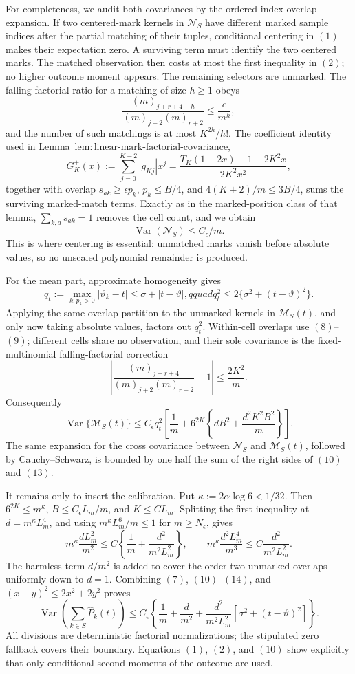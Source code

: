 For completeness, we audit both covariances by the ordered-index overlap expansion.  If two centered-mark kernels in \(\mathcal N_S\) have different marked sample indices after the partial matching of their tuples, conditional centering in \((1)\) makes their expectation zero.  A surviving term must identify the two centered marks.  The matched observation then costs at most the first inequality in \((2)\); no higher outcome moment appears.  The remaining selectors are unmarked.  The falling-factorial ratio for a matching of size \(h\ge1\) obeys
\[
 \frac{(m)_{j+r+4-h}}{(m)_{j+2}(m)_{r+2}}
 \le \frac e{m^h},
\tag{8}
\]
and the number of such matchings is at most \(K^{2h}/h!\).  The coefficient identity used in Lemma~\(\mathrm{lem:linear\text{-}mark\text{-}factorial\text{-}covariance}\),
\[
 G_K^+(x):=\sum_{j=0}^{K-2}|g_{Kj}|x^j
 =\frac{T_K(1+2x)-1-2K^2x}{2K^2x^2},
\tag{9}
\]
together with overlap \(s_{ak}\ge\epsilon p_k\), \(p_k\le B/4\), and \(4(K+2)/m\le3B/4\), sums the surviving marked-match terms.  Exactly as in the marked-position class of that lemma, \(\sum_{k,a}s_{ak}=1\) removes the cell count, and we obtain
\[
 \operatorname{Var}(\mathcal N_S)\le C_{\epsilon}/m.
\tag{10}
\]
This is where centering is essential: unmatched marks vanish before absolute values, so no unscaled polynomial remainder is produced.

For the mean part, approximate homogeneity gives
\[
 q_t:=\max_{k:p_k>0}|\vartheta_k-t|
 \le\sigma+|t-\vartheta|,qquad
 q_t^2\le2\{\sigma^2+(t-\vartheta)^2\}.
\tag{11}
\]
Applying the same overlap partition to the unmarked kernels in \(\mathcal M_S(t)\), and only now taking absolute values, factors out \(q_t^2\).  Within-cell overlaps use \((8)\)--\((9)\); different cells share no observation, and their sole covariance is the fixed-multinomial falling-factorial correction
\[
 \left|\frac{(m)_{j+r+4}}{(m)_{j+2}(m)_{r+2}}-1\right|
 \le\frac{2K^2}{m}.
\tag{12}
\]
Consequently
\[
 \operatorname{Var}\{\mathcal M_S(t)\}
 \le C_{\epsilon}q_t^2\left[
 \frac1m+6^{2K}\left\{dB^2+\frac{d^2K^2B^2}{m}\right\}
 \right].
\tag{13}
\]
The same expansion for the cross covariance between \(\mathcal N_S\) and \(\mathcal M_S(t)\), followed by Cauchy--Schwarz, is bounded by one half the sum of the right sides of \((10)\) and \((13)\).

It remains only to insert the calibration.  Put \(\kappa:=2\alpha\log6<1/32\).  Then \(6^{2K}\le m^{\kappa}\), \(B\le C_{\epsilon}L_m/m\), and \(K\le C L_m\).  Splitting the first inequality at \(d=m^{\kappa}L_m^4\), and using \(m^{\kappa}L_m^6/m\le1\) for \(m\ge N_{\epsilon}\), gives
\[
 m^{\kappa}\frac{dL_m^2}{m^2}
 \le C\left\{\frac1m+\frac{d^2}{m^2L_m^2}\right\},
 \qquad
 m^{\kappa}\frac{d^2L_m^4}{m^3}
 \le C\frac{d^2}{m^2L_m^2}.
\tag{14}
\]
The harmless term \(d/m^2\) is added to cover the order-two unmarked overlaps uniformly down to \(d=1\).  Combining \((7)\), \((10)\)--\((14)\), and \((x+y)^2\le2x^2+2y^2\) proves
\[
 \operatorname{Var}\!\left(\sum_{k\in S}\widehat P_k(t)\right)
 \le C_{\epsilon}\left\{
 \frac1m+\frac d{m^2}
 +\frac{d^2}{m^2L_m^2}
 [\sigma^2+(t-\vartheta)^2]
 \right\}.
\]
All divisions are deterministic factorial normalizations; the stipulated zero fallback covers their boundary.  Equations \((1)\), \((2)\), and \((10)\) show explicitly that only conditional second moments of the outcome are used.